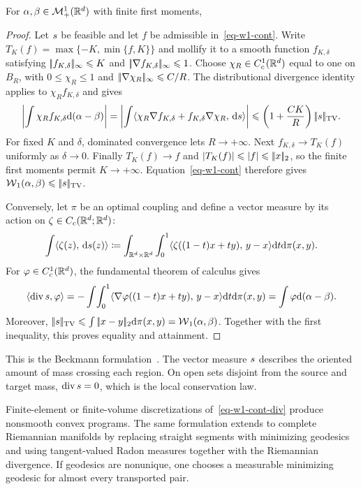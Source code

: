 \begin{prop}\label{prop-euclidean-beckmann}
	For $\alpha,\beta\in\mathcal{M}_+^1(\mathbb{R}^d)$ with finite first moments,
\end{prop}
\begin{proof}
	Let $s$ be feasible and let $f$ be admissible in~\eqref{eq-w1-cont}. Write $T_K(f)=\max\{-K,\min\{f,K\}\}$ and mollify it to a smooth function $f_{K,\delta}$ satisfying $|\!| f_{K,\delta} |\!|_\infty\leqslant K$ and $|\!| \nabla f_{K,\delta} |\!|_\infty\leqslant1$. Choose $\chi_R\in C_c^1(\mathbb{R}^d)$ equal to one on $B_R$, with $0\leq\chi_R\leq1$ and $|\!| \nabla\chi_R |\!|_\infty\leqslant C/R$. The distributional divergence identity applies to $\chi_R f_{K,\delta}$ and gives
	\[
		\left|\int \chi_R f_{K,\delta}\mathrm{d}(\alpha-\beta)\right|
		=
		\left|\int\langle \chi_R\nabla f_{K,\delta}+f_{K,\delta}\nabla\chi_R,\,\mathrm{d}s\rangle\right|
		\leqslant
		\left(1+\frac{CK}{R}\right)|\!| s |\!|_{\operatorname{TV}}.
	\]
	For fixed $K$ and $\delta$, dominated convergence lets $R\to+\infty$. Next $f_{K,\delta}\to T_K(f)$ uniformly as $\delta\to0$. Finally $T_K(f)\to f$ and $|T_K(f)|\leqslant|f|\leqslant|\!| x |\!|_2$, so the finite first moments permit $K\to+\infty$. Equation~\eqref{eq-w1-cont} therefore gives $\operatorname{\mathcal{W}}_1(\alpha,\beta)\leqslant|\!| s |\!|_{\operatorname{TV}}$.

	Conversely, let $\pi$ be an optimal coupling and define a vector measure by its action on $\zeta\in C_c(\mathbb{R}^d;\mathbb{R}^d)$:
	\[
		\int\langle \zeta(z),\,\mathrm{d}s(z)\rangle
		\coloneqq
		\int_{\mathbb{R}^d\times\mathbb{R}^d}\int_0^1
		\langle \zeta((1-t)x+ty),\,y-x\rangle\mathrm{d} t\mathrm{d}\pi(x,y).
	\]
	For $\varphi\in C_c^1(\mathbb{R}^d)$, the fundamental theorem of calculus gives
	\[
		\langle\operatorname{div}s,\varphi\rangle
		=
		-\int\!\int_0^1
		\langle \nabla\varphi((1-t)x+ty),\,y-x\rangle\mathrm{d} t\mathrm{d}\pi(x,y)
		=
		\int\varphi\mathrm{d}(\alpha-\beta).
	\]
	Moreover, $|\!| s |\!|_{\operatorname{TV}}\leqslant\int|\!| x-y |\!|_2\mathrm{d}\pi(x,y)=\operatorname{\mathcal{W}}_1(\alpha,\beta)$. Together with the first inequality, this proves equality and attainment.
\end{proof}

This is the Beckmann formulation~\cite{Beckmann52,SantambrogioBook}. The vector measure $s$ describes the oriented amount of mass crossing each region. On open sets disjoint from the source and target mass, $\operatorname{div}s=0$, which is the local conservation law.

Finite-element or finite-volume discretizations of~\eqref{eq-w1-cont-div} produce nonsmooth convex programs. The same formulation extends to complete Riemannian manifolds by replacing straight segments with minimizing geodesics and using tangent-valued Radon measures together with the Riemannian divergence. If geodesics are nonunique, one chooses a measurable minimizing geodesic for almost every transported pair.

